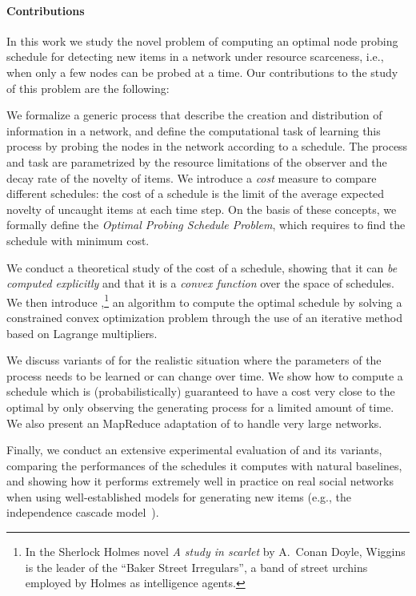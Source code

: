 \paragraph*{Contributions}
In this work we study the novel problem of computing an optimal node probing
schedule for detecting new items in a network under resource scarceness, i.e.,
when only a few nodes can be probed at a time. Our contributions to the study of
this problem are the following:

\begin{itemize*}
	\item We formalize a generic process that describe the creation and
		distribution of information in a network, and define the computational task of
		learning this process by probing the nodes in the network according to a
		schedule. The process and task are parametrized by the resource
		limitations of the observer and the decay rate of the novelty of
		items. We introduce a \emph{cost} measure to compare different
		schedules: the cost of a schedule is the limit of the average expected
		novelty of uncaught items at each time step. On the basis of
		these concepts,  we formally define the \emph{Optimal Probing Schedule
		Problem}, which requires to find the schedule with minimum cost.
	\item We conduct a theoretical study of the cost of a schedule, showing that
		it can \emph{be computed explicitly} and that it is a \emph{convex
		function} over the space of schedules. We then introduce
		\algoname,\footnote{In the Sherlock Holmes novel \emph{A study in
		scarlet} by A.~Conan Doyle, Wiggins is the leader of the ``Baker Street
		Irregulars'', a band of street urchins employed by Holmes as
		intelligence agents.} an algorithm to compute the optimal schedule by
		solving a constrained convex optimization problem through the use of an
		iterative method based on Lagrange multipliers.
	\item We discuss variants of \algoname for the realistic situation where
		the parameters of the process needs to be learned or can change over
		time. We show how to compute a schedule which is (probabilistically)
		guaranteed to have a cost very close to the optimal by only observing
		the generating process for a limited amount of time. We also present an
		MapReduce adaptation of \algoname to handle very large networks.
	\item Finally, we conduct an extensive experimental evaluation of \algoname
		and its variants, comparing the performances of the schedules it
		computes with natural baselines, and showing how it performs extremely
		well in practice on real social networks when using well-established
		models for generating new items (e.g., the independence cascade
		model~\citep{Kempe2003}).
\end{itemize*}

